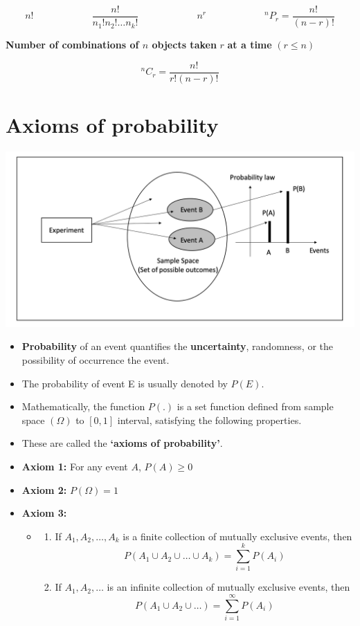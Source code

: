 \documentclass[]{book}
\providecommand{\tightlist}{%
  \setlength{\itemsep}{0pt}\setlength{\parskip}{0pt}}
\begin{document}
\[n!\quad\quad \quad \quad \quad \quad  \frac{n!}{n_1!n_2!\dots n_k!}\quad\quad \quad \quad \quad \quad n^r\quad \quad \quad \quad  \quad \quad ^nP_r = \frac{n!}{(n-r)!}\]

\textbf{Number of combinations of \(n\) objects taken} \(r\) \textbf{at a time} \(( r \leq n)\)

\[^nC_r = \frac{n!}{r!(n-r)!}\]

\hypertarget{axioms-of-probability}{%
\section{Axioms of probability}\label{axioms-of-probability}}

\begin{center}\includegraphics[width=1\linewidth]{figure/Axioms} \end{center}

\begin{itemize}
\item
  \textbf{Probability} of an event quantifies the \textbf{uncertainty}, randomness, or the possibility of occurrence the event.
\item
  The probability of event E is usually denoted by \(P(E)\).
\item
  Mathematically, the function \(P(.)\) is a set function defined from sample space \((\Omega)\) to \([0, 1]\) interval, satisfying the following properties.
\item
  These are called the \textbf{`axioms of probability'}.
\item
  \textbf{Axiom 1:} For any event \(A\), \(P(A) \geq 0\)
\item
  \textbf{Axiom 2:} \(P(\Omega) = 1\)
\item
  \textbf{Axiom 3:}

  \begin{itemize}
  \item
    \begin{enumerate}
    \def\labelenumi{(\alph{enumi})}
    \tightlist
    \item
      If \(A_1, A_2, \dots, A_k\) is a finite collection of mutually exclusive events, then \[P(A_1\cup A_2\cup \dots \cup A_k)= \sum_{i=1}^kP(A_i)\]
    \item
      If \(A_1, A_2, \dots\) is an infinite collection of mutually exclusive events, then
      \[P(A_1\cup A_2\cup \dots)= \sum_{i=1}^\infty P(A_i)\]
    \end{enumerate}
  \end{itemize}
\end{itemize}
\end{document}
